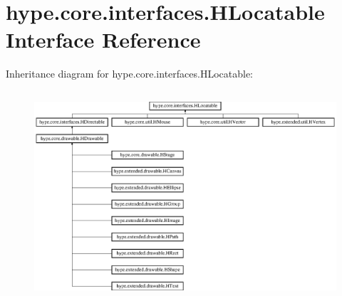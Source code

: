\hypertarget{interfacehype_1_1core_1_1interfaces_1_1_h_locatable}{\section{hype.\-core.\-interfaces.\-H\-Locatable Interface Reference}
\label{interfacehype_1_1core_1_1interfaces_1_1_h_locatable}
}
Inheritance diagram for hype.\-core.\-interfaces.\-H\-Locatable\-:\begin{figure}[H]
\begin{center}
\leavevmode
\includegraphics[height=7.813953cm]{interfacehype_1_1core_1_1interfaces_1_1_h_locatable}
\end{center}
\end{figure}
